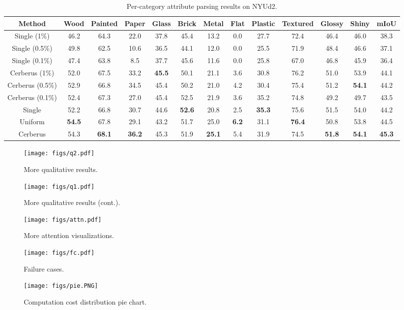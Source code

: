 \documentclass[10pt,twocolumn,letterpaper]{article}
\begin{document}
\begin{table*}
  \centering
  \small
  \begin{tabular}{c|ccccccccccc|c}
    \toprule
    \textbf{Method} & Wood & Painted & Paper & Glass & Brick & Metal & Flat & Plastic & Textured & Glossy & Shiny & mIoU\\
    \midrule
    Single (1\%) &46.2& 64.3& 22.0& 37.8& 45.4& 13.2& 0.0& 27.7& 72.4& 46.4& 46.0 & 38.3 \\
    Single (0.5\%) &49.8& 62.5& 10.6& 36.5& 44.1& 12.0& 0.0& 25.5& 71.9& 48.4& 46.6 &37.1\\
    Single (0.1\%)&47.4& 63.8& 8.5& 37.7& 45.6& 11.6& 0.0& 25.8& 67.0& 46.8& 45.9 &36.4\\
    \midrule
    Cerberus (1\%) &52.0& 67.5& 33.2& \textbf{45.5} & 50.1& 21.1& 3.6& 30.8& 76.2& 51.0& 53.9 &44.1 \\
    Cerberus (0.5\%) &52.9& 66.8& 34.5& 45.4& 50.2& 21.0& 4.2& 30.4& 75.4& 51.2& \textbf{54.1} & 44.2\\
    Cerberus (0.1\%) &52.4& 67.3& 27.0& 45.4& 52.5& 21.9& 3.6& 35.2& 74.8& 49.2& 49.7 & 43.5\\
    \midrule
    Single &52.2&66.8&30.7&44.6&\textbf{52.6}&20.8&2.5&\textbf{35.3}&75.6&51.5&54.0 & 44.2 \\
    Uniform &\textbf{54.5}& 67.8& 29.1& 43.2& 51.7& 25.0& \textbf{6.2}& 31.1& \textbf{76.4}& 50.8& 53.8 & 44.5\\
    Cerberus & 54.3 & \textbf{68.1} & \textbf{36.2} & 45.3 & 51.9 &\textbf{25.1} & 5.4 & 31.9 & 74.5 & \textbf{51.8} & \textbf{54.1} &\textbf{45.3} \\
    \bottomrule
  \end{tabular}
  \caption{Per-category attribute parsing results on NYUd2.}
  \label{tab:att}
\end{table*}


\begin{figure*}[h]
  \centering
    \label{fig:subfig:subfig-a} 
    \texttt{[image: figs/q2.pdf]}
      \caption{More qualitative results. }
\end{figure*}

\begin{figure*}[t]
  \centering
  \ContinuedFloat
    \label{fig:subfig:subfig-b} 
    \texttt{[image: figs/q1.pdf]}
  \caption{More qualitative results (cont.).}
  \label{fig:more} 
\end{figure*}

\begin{figure*}[t]
  \centering
  \texttt{[image: figs/attn.pdf]}
  \caption{More attention visualizations. }
  \label{fig:attn} 
\end{figure*}

\begin{figure*}[t]
  \centering
  \texttt{[image: figs/fc.pdf]}
  \caption{Failure cases. }
  \label{fig:fc} 
\end{figure*}

\begin{figure*}[t]
  \centering
  \texttt{[image: figs/pie.PNG]}
  \caption{Computation cost distribution pie chart. }
  \label{fig:pie} 
\end{figure*}
\end{document}
